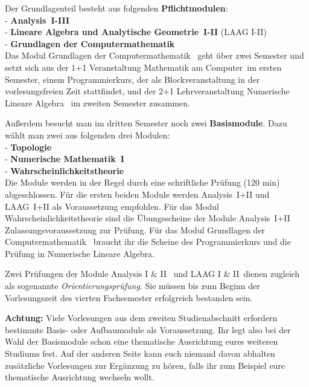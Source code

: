 Der Grundlagenteil besteht aus folgenden {\bf Pflichtmodulen}:\\[6pt]
- {\bf Analysis~I-III}\\[2pt]
- {\bf Lineare Algebra und Analytische Geometrie~I-II}  (LAAG I-II)\\[2pt]
- {\bf Grundlagen der Computermathematik}\\[6pt]
Das Modul \glqq Grundlagen der Computermathematik\grqq
~geht über zwei Semester und setzt sich aus der 1+1 Veranstaltung
\glqq Mathematik am Computer\grqq ~im ersten Semester,
einem \glqq Programmierkurs\grqq, der als Blockveranstaltung
in der vorlesungsfreien Zeit stattfindet,
und der 2+1 Lehrveranstaltung \glqq Numerische Lineare Algebra\grqq
~im zweiten Semester zusammen.

Außerdem besucht man im dritten Semester noch zwei {\bf Basismodule}.
Dazu wählt man zwei aus folgenden drei Modulen:\\[6pt]
- {\bf Topologie}\\[2pt]
- {\bf Numerische Mathematik~I}\\[2pt]
- {\bf Wahrscheinlichkeitstheorie}\\[6pt]
Die Module werden in der Regel
durch eine schriftliche Prüfung (120 min) abgeschlossen.
Für die ersten beiden Module werden Analysis~I+II
und LAAG~I+II als Voraussetzung empfohlen.
Für das Modul Wahrscheinlichkeitstheorie
sind die Übungsscheine der Module
Analysis~I+II Zulassungsvoraussetzung zur Prüfung.
Für das Modul \glqq Grundlagen der Computermathematik\grqq
\ braucht ihr die Scheine des Programmierkurs
und die Prüfung in \glqq Numerische Lineare Algebra\grqq.

Zwei Prüfungen der Module \glqq Analysis I \& II\grq
~und \glqq LAAG I \& II\grqq~dienen zugleich
als sogenannte {\it Orientierungsprüfung}.
Sie müssen bis zum Beginn der Vorlesungszeit des vierten Fachsemester
erfolgreich bestanden sein.

{\bf Achtung:}
Viele Vorlesungen aus dem zweiten Studienabschnitt erfordern
bestimmte Basis- oder Aufbaumodule als Voraussetzung.
Ihr legt also bei der Wahl der Basismodule
schon eine thematische Ausrichtung eures weiteren Studiums fest.
Auf der anderen Seite kann euch niemand davon abhalten
zusätzliche Vorlesungen zur Ergänzung zu hören,
falls ihr zum Beispiel eure thematische Ausrichtung wechseln wollt.

